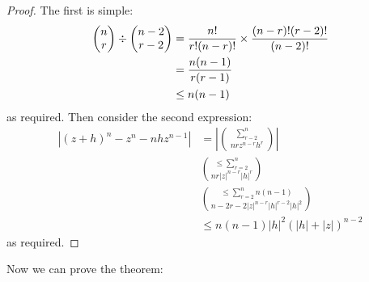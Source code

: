 \documentclass[../Main.tex]{subfiles}
\begin{document}
\begin{proof}
    The first is simple:
    \begin{align*}
        \choose{n}{r} \div \choose{n-2}{r-2} &= \frac{n!}{r!(n-r)!} \times \frac{(n-r)!(r-2)!}{(n-2)!} \\
        &= \frac{n(n-1)}{r(r-1)} \\
        &\leq n(n-1)
    \end{align*}
    as required. Then consider the second expression:
    \begin{align*}
        |(z + h)^n - z^n - nhz^{n-1}| &= \left|\sum_{r-2}^n \choose{n}{r} z^{n-r} h^r\right| \\
        &\leq \sum_{r=2}^n \choose{n}{r} |z|^{n-r} |h|^r \\ 
        &\leq \sum_{r=2}^n n(n-1) \choose{n-2}{r-2} |z|^{n-r} |h|^{r-2} |h|^2 \\ 
        &\leq n(n-1) |h|^2 \left(|h| + |z|\right)^{n-2}
    \end{align*}
    as required.
\end{proof}
Now we can prove the theorem:
\end{document}
